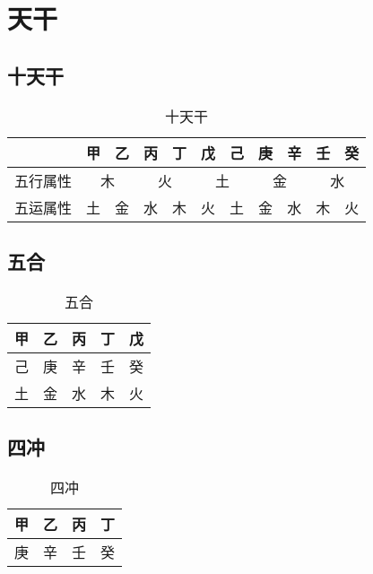 \section{天干}

\subsection{十天干}
\begin{table}[H]
  \centering
  \caption{十天干}
  \begin{tabular}{|c|c|c|c|c|c|c|c|c|c|c|}
    \hline & 甲 & 乙 & 丙 & 丁 & 戊 & 己 & 庚 & 辛 & 壬 & 癸 \\
    \hline 五行属性 & \multicolumn{2}{c|}{木} & \multicolumn{2}{c|}{火} & \multicolumn{2}{c|}{土} & \multicolumn{2}{c|}{金} & \multicolumn{2}{c|}{水} \\
    \hline 五运属性 & 土 & 金 & 水 & 木 & 火 & 土 & 金 & 水 & 木 & 火 \\
    \hline
  \end{tabular}
\end{table}

\subsection{五合}
\begin{table}[H]
  \centering
  \caption[]{五合\footnotemark}
  \begin{tabular}{|c|c|c|c|c|}
    \hline 甲 & 乙 & 丙 & 丁 & 戊 \\
    \hline 己 & 庚 & 辛 & 壬 & 癸 \\
    \hline 土 & 金 & 水 & 木 & 火 \\
    \hline
  \end{tabular}
\end{table}

\subsection{四冲}

\begin{table}[H]
  \centering
  \caption[]{四冲\footnotemark}
  \begin{tabular}{|c|c|c|c|}
    \hline 甲 & 乙 & 丙 & 丁 \\
    \hline 庚 & 辛 & 壬 & 癸 \\
    \hline
  \end{tabular}
\end{table}
